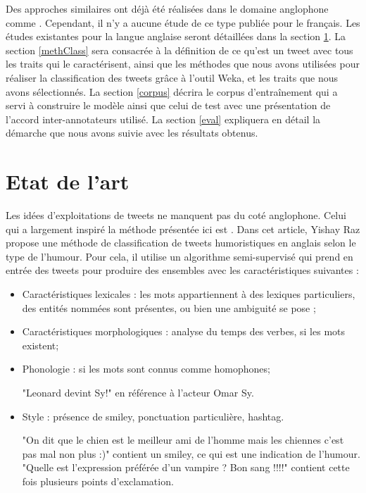 \documentclass[10pt,a4paper,twoside]{article}
\begin{document}
Des approches similaires ont déjà été réalisées dans le domaine anglophone comme \cite{Raz12, Barbosa2010}. Cependant, il n'y a aucune étude de ce type publiée pour le français. Les études existantes pour la langue anglaise seront détaillées dans la section \ref{art}.  La section \ref{methClass} sera consacrée à la définition de ce qu'est un tweet avec tous les traits qui le caractérisent, ainsi que les méthodes que nous avons utilisées pour réaliser la classification des tweets grâce à l'outil Weka, et les traits que nous avons sélectionnés. La section \ref{corpus} décrira le corpus d'entraînement qui a servi à construire le modèle ainsi que celui de test avec une présentation de l'accord inter-annotateurs utilisé. La section \ref{eval} expliquera en détail la démarche que nous avons suivie avec les résultats obtenus.



\section{Etat de l'art}
\label{art}
Les idées d’exploitations de tweets ne manquent pas du coté anglophone. Celui qui a largement inspiré la méthode présentée ici est \cite{Raz12}.  Dans cet article, Yishay Raz propose une méthode de classification de tweets humoristiques en anglais selon le type de l’humour. Pour cela, il utilise un algorithme semi-supervisé qui prend en entrée des tweets pour produire des ensembles avec les caractéristiques suivantes :

\begin{itemize}
\item Caractéristiques lexicales : les mots appartiennent à des lexiques particuliers, des entités nommées sont présentes, ou bien une ambiguité se pose ;
\item Caractéristiques morphologiques : analyse du temps des verbes, si les mots existent;
\item Phonologie : si les mots sont connus comme homophones;

"Leonard devint Sy!" en référence à l'acteur Omar Sy.
\item Style : présence de smiley, ponctuation particulière, hashtag.

"On dit que le chien est le meilleur ami de l'homme mais les chiennes c'est pas mal non plus :)" contient un smiley, ce qui est une indication de l'humour. "Quelle est l'expression préférée d'un vampire ? Bon sang !!!!" contient cette fois plusieurs points d'exclamation.
\end{itemize}
\end{document}
